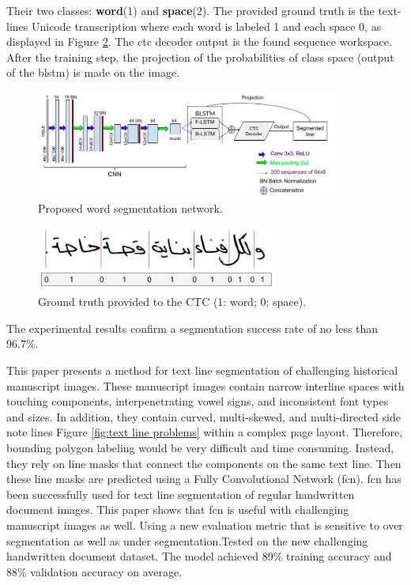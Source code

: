 \begin{itemize}[labelindent=1em,labelsep=0.25cm,leftmargin=*]
        Their two classes: \textbf{word}(1) and \textbf{space}(2). The
        provided ground truth is the text-lines Unicode transcription
        where each word is labeled 1 and each space 0, as displayed in Figure \ref{fig:word_seg}. The \acrshort{ctc} decoder output is the found sequence workspace. After the training step, the projection of the probabilities of class space (output of the \acrshort{blstm}) is made on the image.
        \begin{figure}[!htb]
        \centering
        \includegraphics[width=10cm]{images/seg_network.png}
        \caption{Proposed word segmentation network.}
        \label{fig:seg_network}
        \end{figure}
        
        \begin{figure}[!htb]
        \centering
        \includegraphics[width=8cm]{images/word_seg.png}
        \caption{Ground truth provided to the CTC (1: word; 0: space).}
        \label{fig:word_seg}
        \end{figure}
    The experimental results confirm a segmentation success rate of no less than 96.7\%. 
 \end{itemize}

This paper \cite{FCN} presents a method for text line segmentation
of challenging historical manuscript images. These manuscript images contain narrow interline spaces with touching components, interpenetrating vowel signs, and inconsistent font types and sizes. In addition, they contain curved, multi-skewed, and multi-directed side note lines Figure \ref{fig:text line problems} within a complex page layout. Therefore, bounding polygon labeling would be very difficult and time consuming. Instead, they rely on line masks that connect the components on the same text line. Then these line masks are predicted using a Fully Convolutional Network (\acrshort{fcn}). \acrshort{fcn} has been successfully used for text line segmentation of regular handwritten document images. This paper shows that \acrshort{fcn} is useful with challenging manuscript images as well. Using a new evaluation metric that is sensitive to over segmentation as well as under segmentation.Tested on the new challenging handwritten document dataset. The model achieved 89\% training accuracy and 88\% validation accuracy on average.

